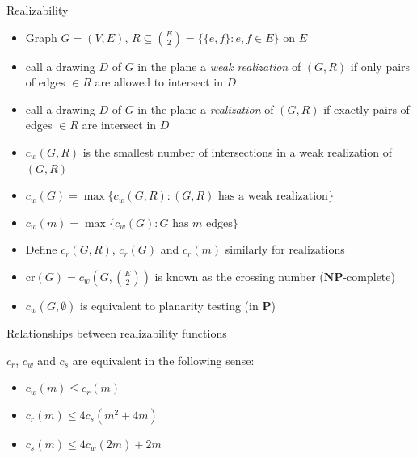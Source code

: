 \documentclass[10pt,aspectratio=169]{beamer}
\theoremstyle{plain}
\newcommand{\set}[1]{\{#1\}}
\begin{document}
\begin{frame}{Realizability}
    \begin{itemize}
        \item Graph \(G = (V, E)\), \(R \subseteq \binom{E}{2} = \set{\set{e, f} : e, f \in E} \) on \(E\)
        \item call a drawing \(D\) of \(G\) in the plane a \textit{weak realization} of \((G, R)\) if only pairs of edges \(\in R\) are allowed to intersect in \(D\)
        \item call a drawing \(D\) of \(G\) in the plane a \textit{realization} of \((G, R)\) if exactly pairs of edges \(\in R\) are intersect in \(D\)
        \pause
        \item \(c_w(G, R)\) is the smallest number of intersections in a weak realization of \((G, R)\)
        \item \(c_w(G) = \max\set{c_w(G, R) : (G, R) \text{ has a weak realization}} \)
        \item \(c_w(m) = \max\set{c_w(G) : G \text{ has } m \text{ edges}}\)
        \item Define \(c_r(G, R)\), \(c_r(G)\) and \(c_r(m)\) similarly for realizations
        \pause
        \item \(\mathrm{cr}(G) = c_w(G, \binom{E}{2})\) is known as the crossing number (\(\mathbf{NP}\)-complete)
        \item \(c_w(G, \emptyset)\) is equivalent to planarity testing (in \(\mathbf{P}\))
    \end{itemize}
\end{frame}

\begin{frame}{Relationships between realizability functions \cite{schaefer01} \cite{kra91b}}
    \begin{lemma}
        \(c_r\), \(c_w\) and \(c_s\) are equivalent in the following sense:
        \begin{itemize}
            \item \(c_w(m) \leq c_r(m)\)
            \item \(c_r(m) \leq 4 c_s(m^2 + 4m)\)
            \item \(c_s(m) \leq 4 c_w(2m) + 2m\)
        \end{itemize}
        \label{lem:pol-equivalent}
    \end{lemma}
\end{frame}
\end{document}

